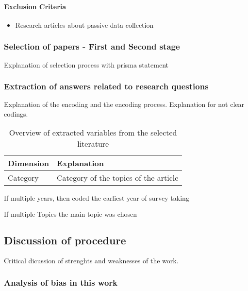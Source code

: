 \paragraph{Exclusion Criteria}
\begin{itemize}
    \item Research articles about passive data collection
\end{itemize}

\subsubsection{Selection of papers - First and Second stage}

Explanation of selection process with prisma statement


\subsubsection{Extraction of answers related to research questions}

Explanation of the encoding and the encoding process. Explanation for not clear codings. 

\begin{table}
	\caption{Overview of extracted variables from the selected literature}
	\centering
	\begin{tabular}{ll}
		\toprule
		Dimension & Explanation \\
		\midrule
		Category & Category of the topics of the article \\
		\bottomrule 
	\end{tabular}
	\label{tab: review dimensions}
\end{table}


If multiple years, then coded the earliest year of survey taking


If multiple Topics the main topic was chosen



\subsection{Discussion of procedure}

Critical dicussion of strenghts and weaknesses of the work. 

\subsubsection{Analysis of bias in this work}

